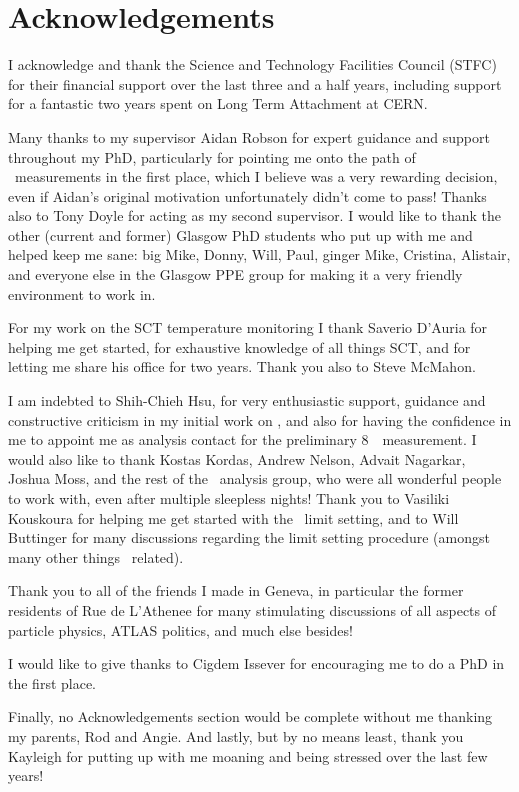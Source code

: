 \chapter*{Acknowledgements}
I acknowledge and thank the Science and Technology Facilities Council
(STFC) for their financial support over the last three and a half years,
including support for a fantastic two years spent on Long Term Attachment at CERN.

Many thanks to my supervisor Aidan Robson for expert guidance and support throughout my
PhD, particularly for pointing me onto the path of \ZZ\ measurements in the first
place, which I believe was a very rewarding decision, even if Aidan's original
motivation unfortunately didn't come to
pass! 
Thanks also to Tony
Doyle for acting as my second supervisor.
I would like to thank the other (current and former) Glasgow PhD students who put up with me and
helped keep me sane: big Mike, Donny, Will, Paul, ginger Mike, Cristina,
Alistair, and everyone else in the Glasgow PPE group for making it a very
friendly environment to work in.

For my work on the SCT temperature monitoring I thank Saverio D'Auria
for helping me get started, for exhaustive knowledge of all things SCT, and for
letting me share his office for two years. Thank you also to Steve McMahon.

I am indebted to Shih-Chieh Hsu, for very enthusiastic
support, guidance and constructive criticism in my initial work on \ZZ, and
also for having the confidence in me to appoint me as analysis contact for the
preliminary 8~\tev\ measurement. I would also like to thank Kostas Kordas,
Andrew Nelson, Advait Nagarkar, Joshua Moss, and the rest of the \ZZ\ analysis
group, who were all wonderful people to work with, even after multiple sleepless
nights! Thank you to Vasiliki Kouskoura for helping me get started with the
\TGC\ limit setting, and to Will Buttinger for many discussions regarding the
limit setting procedure (amongst many other things \ZZ\ related).

Thank you to all of the friends I made in Geneva, in particular the former
residents of Rue de L'Athenee for many stimulating discussions of all aspects of
particle physics, ATLAS politics, and much else besides!

I would like to give thanks to Cigdem Issever for encouraging me to do a PhD in the first
place. 

Finally, no Acknowledgements section would be complete without me
thanking my parents, Rod and Angie. And lastly, but by no means least, thank you Kayleigh for putting up with
me moaning and being stressed over the last few years!
